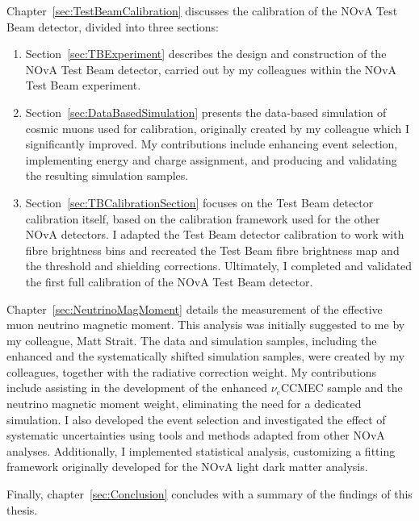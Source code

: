 Chapter~\ref{sec:TestBeamCalibration} discusses the calibration of the NOvA Test Beam detector, divided into three sections: 
\begin{enumerate}
\item Section~\ref{sec:TBExperiment} describes the design and construction of the NOvA Test Beam detector, carried out by my colleagues within the NOvA Test Beam experiment.
\item Section~\ref{sec:DataBasedSimulation} presents the data-based simulation of cosmic muons used for calibration, originally created by my colleague which I significantly improved. My contributions include enhancing event selection, implementing energy and charge assignment, and producing and validating the resulting simulation samples.
\item Section~\ref{sec:TBCalibrationSection} focuses on the Test Beam detector calibration itself, based on the calibration framework used for the other NOvA detectors. I adapted the Test Beam detector calibration to work with fibre brightness bins and recreated the Test Beam fibre brightness map and the threshold and shielding corrections. Ultimately, I completed and validated the first full calibration of the NOvA Test Beam detector.
\end{enumerate}

Chapter~\ref{sec:NeutrinoMagMoment} details the measurement of the effective muon neutrino magnetic moment. This analysis was initially suggested to me by my colleague, Matt Strait. The data and simulation samples, including the enhanced and the systematically shifted simulation samples, were created by my colleagues, together with the radiative correction weight. My contributions include assisting in the development of the enhanced $\nu_e$CCMEC sample and the neutrino magnetic moment weight, eliminating the need for a dedicated simulation. I also developed the event selection and investigated the effect of systematic uncertainties using tools and methods adapted from other NOvA analyses. Additionally, I implemented statistical analysis, customizing a fitting framework originally developed for the NOvA light dark matter analysis.

Finally, chapter~\ref{sec:Conclusion} concludes with a summary of the findings of this thesis.

\iffalse

